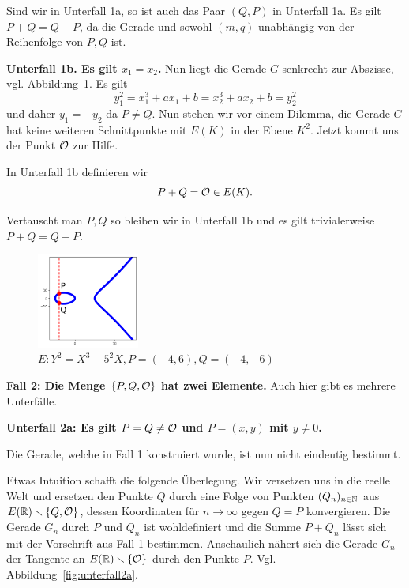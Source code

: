 Sind wir in  Unterfall 1a, so ist auch das Paar $(Q,P)$ in Unterfall
1a. Es gilt $P+Q=Q+P$, da die Gerade und sowohl $(m,q)$ unabhängig von
der Reihenfolge von $P,Q$ ist. 

\textbf{Unterfall 1b. Es gilt $x_1=x_2$.} Nun liegt die Gerade $G$
senkrecht zur Abszisse, vgl. Abbildung~\ref{fig:unterfall1b}. Es gilt
\begin{equation*}
  y_1^2 = x_1^3+a x_1 +b = x_2^3+a x_2 +b = y_2^2
\end{equation*}
und daher $y_1=-y_2$ da $P\not=Q$. Nun stehen wir vor einem
Dilemma, die Gerade $G$ hat keine weiteren Schnittpunkte mit $E(K)$ in
der Ebene $K^2$. Jetzt kommt uns der Punkt ${\mathcal O}$ zur Hilfe.

In Unterfall 1b definieren wir
\begin{equation*}
  P+Q = {\mathcal O} \in E(K).
\end{equation*}

Vertauscht man $P,Q$ so bleiben wir in Unterfall 1b und es gilt
trivialerweise $P+Q=Q+P$.  

\begin{figure}
  \centering    
  \caption{$E: Y^2 = X^3-5^2 X,P = (-4,6),Q = (-4,-6)$}
  \label{fig:unterfall1b}
  \includegraphics[width=0.3\textwidth]{./plots/unterfall1b.png}
\end{figure}

\medskip
\textbf{Fall 2: Die Menge $\{P,Q,{\mathcal O}\}$ hat zwei Elemente.} Auch hier
gibt es mehrere Unterfälle.

\textbf{Unterfall 2a: Es gilt $P=Q\not={\mathcal O}$ und $P=(x,y)$ mit $y\not=0$.}

Die Gerade, welche in Fall 1 konstruiert wurde, ist nun nicht
eindeutig bestimmt.

Etwas Intuition schafft die folgende Überlegung. Wir
versetzen uns in die reelle Welt und ersetzen den Punkte $Q$ durch
eine Folge von Punkten $(Q_n)_{n\in{\mathbb{N}}}$ aus $E({\mathbb{R}})\smallsetminus\{Q,{\mathcal O}\}$, dessen
Koordinaten für $n\rightarrow\infty$ gegen $Q=P$ konvergieren.
Die Gerade $G_n$ durch $P$ und $Q_n$ ist wohldefiniert und die Summe
$P+Q_n$ lässt sich mit der Vorschrift aus Fall 1 bestimmen.
Anschaulich nähert sich die Gerade $G_n$ der Tangente an
$E({\mathbb{R}})\smallsetminus\{{\mathcal O}\}$ durch den Punkte $P$. Vgl.
Abbildung~\ref{fig:unterfall2a}. 

